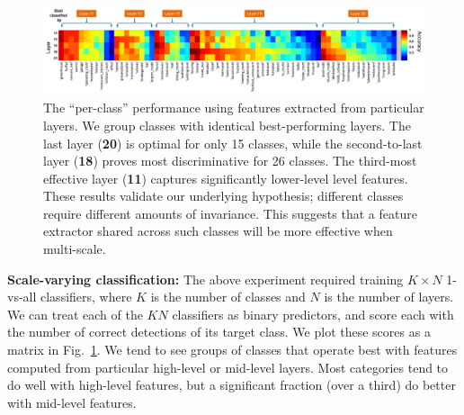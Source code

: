 \documentclass[10pt,twocolumn,letterpaper]{article}
\begin{document}
\begin{figure}[ht!]
\centering
	\includegraphics[width=1\textwidth]{fig/fig_level_perf.png}
\caption{The ``per-class'' performance using features extracted from particular layers. We group classes with identical best-performing layers. The last layer ({\bf 20}) is optimal for only 15 classes, while the second-to-last layer ({\bf 18}) proves most discriminative for 26 classes. The third-most effective layer ({\bf 11}) captures significantly lower-level level features. These results validate our underlying hypothesis; different classes require different amounts of invariance. This suggests that a feature extractor shared across such classes will be more effective when multi-scale.}
\label{fig:level_perf}
\end{figure}


{\bf Scale-varying classification:} The above experiment required training $K \times N$ 1-vs-all classifiers, where $K$ is the number of classes and $N$ is the number of layers. We can treat each of the $KN$ classifiers as binary predictors, and score each with the number of correct detections of its target class. We plot these scores as a matrix in Fig.~\ref{fig:level_perf}. We tend to see groups of classes that operate best with features computed from particular high-level or mid-level layers. %
Most categories tend to do well with high-level features, but a significant fraction (over a third) do better with mid-level features.
\end{document}
